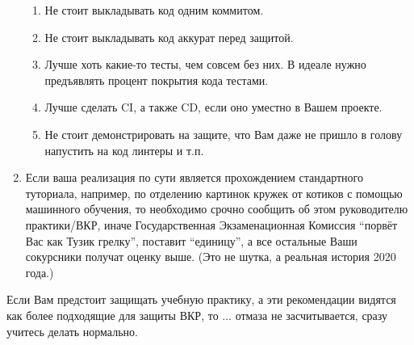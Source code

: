 \begin{enumerate}
\begin{enumerate}
              \item Не стоит выкладывать код одним коммитом.
              \item Не стоит выкладывать код аккурат перед защитой.
              \item Лучше хоть какие-то тесты, чем совсем без них.
                    В идеале нужно предъявлять процент покрытия кода тестами.
              \item Лучше сделать \textsc{CI}, а также \textsc{CD}, если оно уместно в Вашем проекте.
              \item Не стоит демонстрировать на защите, что Вам даже не пришло в голову напустить на код линтеры и т.п.
          \end{enumerate}
    \item Если ваша реализация по сути является прохождением стандартного туториала,
          например, по отделению картинок кружек от котиков с помощью машинного обучения, то необходимо срочно сообщить об этом руководителю практики/ВКР,
          иначе Государственная Экзаменацион\-ная Комиссия \enquote{порвёт Вас как Тузик грелку}, поставит \enquote{единицу},
          а все остальные Ваши сокурсники получат оценку выше.
          (Это не шутка, а реальная история 2020 года.)
\end{enumerate}

\noindent Если Вам предстоит защищать учебную практику, а эти рекомендации видятся как более подходящие для защиты ВКР, то ... отмаза не засчиты\-вается, сразу учитесь делать нормально.
